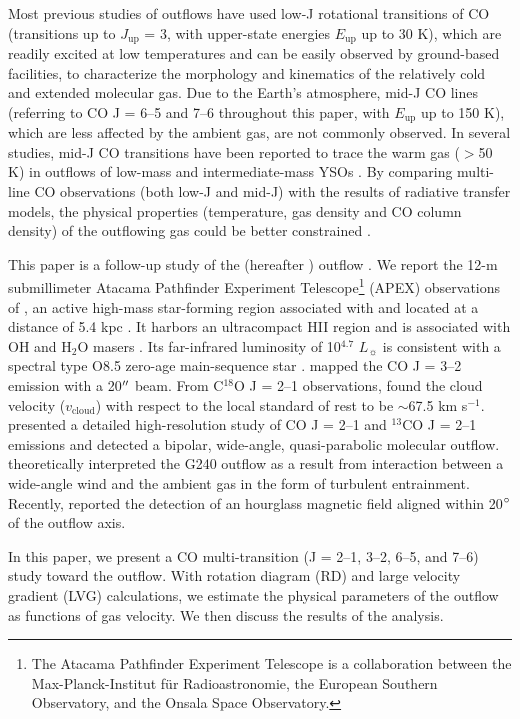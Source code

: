 Most previous studies of outflows have used low-J rotational transitions of CO (transitions up to $J_{\mathrm{up}}$ = 3, with upper-state energies $E_{\mathrm{up}}$ up to 30 K), which are readily excited at low temperatures and can be easily observed by ground-based facilities, to characterize the morphology and kinematics of the relatively cold and extended molecular gas. Due to the Earth's atmosphere, mid-J CO lines (referring to CO J = 6--5 and 7--6 throughout this paper, with  $E_{\mathrm{up}}$ up to 150 K), which are less affected by the ambient gas, are not commonly observed. In several studies, mid-J CO transitions have been reported to trace the warm gas ($>$50 K) in outflows of low-mass and intermediate-mass YSOs \citep{2009A&A...501..633V, 2009A&A...507.1425V, 2012A&A...542A..86Y, 2016A&A...587A..17V}. By comparing multi-line CO observations (both low-J and mid-J) with the results of radiative transfer models, the physical properties (temperature, gas density and CO column density) of the outflowing gas could be better constrained \citep{2015A&A...581A...4L}. 

This paper is a follow-up study of the  (hereafter ) outflow \citep{2009ApJ...696...66Q}. We report the 12-m submillimeter Atacama Pathfinder Experiment Telescope\footnote{    The Atacama Pathfinder Experiment Telescope is a collaboration between the Max-Planck-Institut f{\"u}r Radioastronomie, the European Southern Observatory, and the Onsala Space Observatory.} (APEX) observations of , an active high-mass star-forming region associated with  and located at a distance of 5.4 kpc \citep{2014ApJ...790...99C, 2015PASJ...67...69S}. It harbors an ultracompact H{\scriptsize II} region and is associated with OH and H$_2$O masers \citep{1993AJ....105.1495H, 1997MNRAS.289..203C, 1998AJ....116.1897M, 1999ApJS..123..487M, 2003MNRAS.341..551C}. Its far-infrared luminosity of 10$^{4.7}$ $L_\sun$ is consistent with a spectral type O8.5 zero-age main-sequence star \citep{1998AJ....116.1897M}. \citet{2003A&A...412..175K} mapped the CO J = 3--2 emission with a 20${\mbox{$^{\prime\prime}$}}$ beam. From C$^{18}$O J = 2--1 observations, \citet{2003A&A...412..175K} found the cloud velocity ($v_{\mathrm{cloud}}$) with respect to the local standard of rest to be $\sim$67.5 km s$^{-1}$. \citet{2009ApJ...696...66Q} presented a detailed high-resolution study of CO J = 2--1 and $^{13}$CO J = 2--1 emissions and detected a bipolar, wide-angle, quasi-parabolic molecular outflow. \citet{2013A&A...559A..23L} theoretically interpreted the G240 outflow as a result from interaction between a wide-angle wind and the ambient gas in the form of turbulent entrainment. Recently, \citet{2014ApJ...794L..18Q} reported the detection of an hourglass magnetic field aligned within 20${\mbox{$^\circ$}}$ of the outflow axis.

In this paper, we present a CO multi-transition (J = 2--1, 3--2, 6--5, and 7--6) study toward the  outflow. With rotation diagram (RD) and large velocity gradient (LVG) calculations, we estimate the physical parameters of the outflow as functions of gas velocity. We then discuss the results of the analysis.


